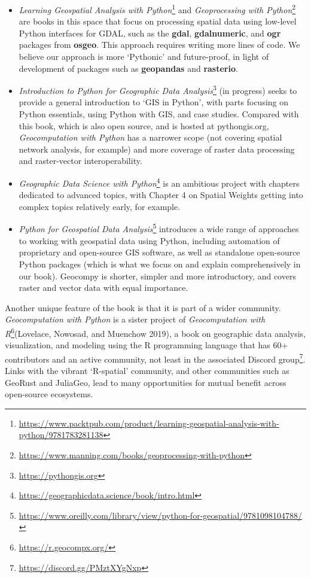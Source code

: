 \documentclass[
  letterpaper,
]{krantz}
\providecommand{\tightlist}{%
  \setlength{\itemsep}{0pt}\setlength{\parskip}{0pt}}\usepackage{longtable,booktabs,array}
\begin{document}
\begin{itemize}
\tightlist
\item
  \emph{Learning Geospatial Analysis with Python}\footnote{\url{https://www.packtpub.com/product/learning-geospatial-analysis-with-python/9781783281138}}
  and \emph{Geoprocessing with Python}\footnote{\url{https://www.manning.com/books/geoprocessing-with-python}}
  are books in this space that focus on processing spatial data using
  low-level Python interfaces for GDAL, such as the \textbf{gdal},
  \textbf{gdalnumeric}, and \textbf{ogr} packages from \textbf{osgeo}.
  This approach requires writing more lines of code. We believe our
  approach is more `Pythonic' and future-proof, in light of development
  of packages such as \textbf{geopandas} and \textbf{rasterio}.
\item
  \emph{Introduction to Python for Geographic Data Analysis}\footnote{\url{https://pythongis.org}}
  (in progress) seeks to provide a general introduction to `GIS in
  Python', with parts focusing on Python essentials, using Python with
  GIS, and case studies. Compared with this book, which is also open
  source, and is hosted at pythongis.org, \emph{Geocomputation with
  Python} has a narrower scope (not covering spatial network analysis,
  for example) and more coverage of raster data processing and
  raster-vector interoperability.
\item
  \emph{Geographic Data Science with Python}\footnote{\url{https://geographicdata.science/book/intro.html}}
  is an ambitious project with chapters dedicated to advanced topics,
  with Chapter 4 on Spatial Weights getting into complex topics
  relatively early, for example.
\item
  \emph{Python for Geospatial Data Analysis}\footnote{\url{https://www.oreilly.com/library/view/python-for-geospatial/9781098104788/}}
  introduces a wide range of approaches to working with geospatial data
  using Python, including automation of proprietary and open-source GIS
  software, as well as standalone open-source Python packages (which is
  what we focus on and explain comprehensively in our book). Geocompy is
  shorter, simpler and more introductory, and covers raster and vector
  data with equal importance.
\end{itemize}

Another unique feature of the book is that it is part of a wider
community. \emph{Geocomputation with Python} is a sister project of
\emph{Geocomputation with R}\footnote{\url{https://r.geocompx.org/}}(Lovelace,
Nowosad, and Muenchow 2019), a book on geographic data analysis,
visualization, and modeling using the R programming language that has
60+ contributors and an active community, not least in the associated
Discord group\footnote{\url{https://discord.gg/PMztXYgNxp}}. Links with
the vibrant `R-spatial' community, and other communities such as GeoRust
and JuliaGeo, lead to many opportunities for mutual benefit across
open-source ecosystems.
\end{document}
